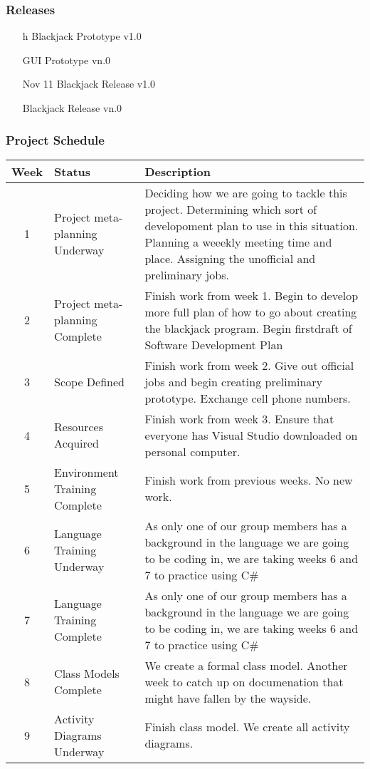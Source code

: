 \documentclass{article}
\begin{document}
\subsubsection{Releases}
\begin{itemize}
\item[h] Blackjack Prototype v1.0
\item[] GUI Prototype vn.0
\item[Nov 11] Blackjack Release v1.0
\item[] Blackjack Release vn.0
\end{itemize}
\subsubsection{Project Schedule}
\begin{tabular}{|c|l|p{4in}|}
\hline
Week	&Status & Description\\ \hline
1	&Project meta-planning Underway	&Deciding how we are going to tackle this project. Determining which sort of developoment plan to use in this situation. Planning a weeekly meeting time and place. Assigning the unofficial and preliminary jobs.\\ \hline
2	&Project meta-planning Complete	&Finish work from week 1. Begin to develop more full plan of how to go about creating the blackjack program. Begin firstdraft of Software Development Plan\\ \hline
3	&Scope Defined				&Finish work from week 2. Give out official jobs and begin creating preliminary prototype. Exchange cell phone numbers.\\ \hline
4	&Resources Acquired			&Finish work from week 3. Ensure that everyone has Visual Studio downloaded on personal computer.\\ \hline
5	&Environment Training Complete		&Finish work from previous weeks. No new work.\\ \hline
6	&Language Training Underway		&As only one of our group members has a background in the language we are going to be coding in, we are taking weeks 6 and 7 to practice using C\#\\ \hline
7	&Language Training Complete		&As only one of our group members has a background in the language we are going to be coding in, we are taking weeks 6 and 7 to practice using C\#\\ \hline
8	&Class Models Complete			&We create a formal class model. Another week to catch up on documenation that might have fallen by the wayside.\\ \hline
9	&Activity Diagrams Underway		&Finish class model. We create all activity diagrams.\\ \hline

\end{tabular}
\end{document}
